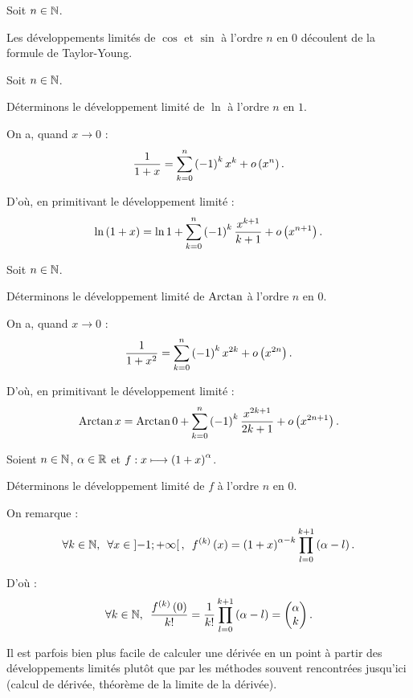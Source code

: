 \begin{dem}[\(\cos\) \& \(\sin\)]
Soit \(n\in\mathbb{N}\).

Les développements limités de \(\cos\) et \(\sin\) à l'ordre \(n\) en \(0\) découlent de la formule de Taylor-Young.
\end{dem}

\begin{dem}[\(\ln\)]
Soit \(n\in\mathbb{N}\).

Déterminons le développement limité de \(\ln\) à l'ordre \(n\) en \(1\).

On a, quand \(x\to0\) : \[\dfrac{1}{1+x}=\sum_{k=0}^n\left(-1\right)^kx^k+o\left(x^n\right).\]

D'où, en primitivant le développement limité : \[\ln\left(1+x\right)=\ln1+\sum_{k=0}^n\left(-1\right)^k\dfrac{x^{k+1}}{k+1}+o\left(x^{n+1}\right).\]
\end{dem}

\begin{dem}[\(\Arctan\)]
Soit \(n\in\mathbb{N}\).

Déterminons le développement limité de \(\Arctan\) à l'ordre \(n\) en \(0\).

On a, quand \(x\to0\) : \[\dfrac{1}{1+x^2}=\sum_{k=0}^n\left(-1\right)^kx^{2k}+o\left(x^{2n}\right).\]

D'où, en primitivant le développement limité : \[\operatorname{Arctan} x=\operatorname{Arctan}0+\sum_{k=0}^n\left(-1\right)^k\dfrac{x^{2k+1}}{2k+1}+o\left(x^{2n+1}\right).\]
\end{dem}

\begin{dem}
Soient \(n\in\mathbb{N}\), \(\alpha\in\mathbb{R}\) et \(f:x\longmapsto\left(1+x\right)^\alpha\).

Déterminons le développement limité de \(f\) à l'ordre \(n\) en \(0\).

On remarque : \[\quantifs{\forall k\in\N;\forall x\in\intervee{-1}{\pinf}}f\deriv{k}\paren{x}=\paren{1+x}^{\alpha-k}\prod_{l=0}^{k+1}\paren{\alpha-l}.\]

D'où : \[\quantifs{\forall k\in\N}\dfrac{f\deriv{k}\paren{0}}{k!}=\dfrac{1}{k!}\prod_{l=0}^{k+1}\paren{\alpha-l}=\binom{k}{\alpha}.\]
\end{dem}

\begin{rem}
Il est parfois bien plus facile de calculer une dérivée en un point à partir des développements limités plutôt que par les méthodes souvent rencontrées jusqu'ici (calcul  de dérivée, théorème de la limite de la dérivée).
\end{rem}

